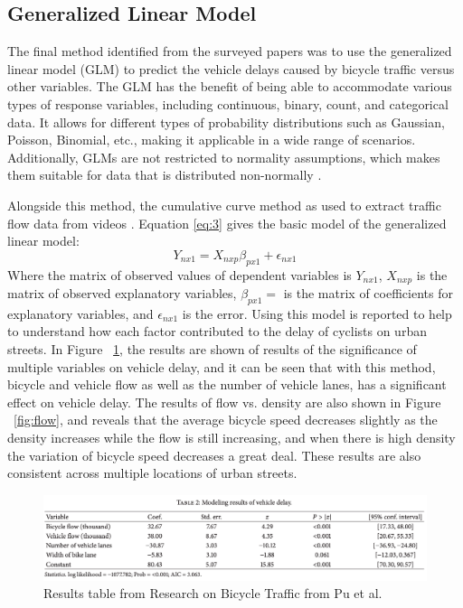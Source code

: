 \documentclass[12pt, letterpaper]{article}
\begin{document}
\subsection{Generalized Linear Model}
\label{sec:gen}

The final method identified from the surveyed papers was to use the generalized linear model (GLM) to predict the vehicle delays caused by bicycle traffic versus other variables. The GLM has the benefit of being able to accommodate various types of response variables, including continuous, binary, count, and categorical data. It allows for different types of probability distributions such as Gaussian, Poisson, Binomial, etc., making it applicable in a wide range of scenarios. Additionally, GLMs are not restricted to normality assumptions, which makes them suitable for data that is distributed non-normally \cite{PennState2023}.

Alongside this method, the cumulative curve method as used to extract traffic flow data from videos \cite{6Pu2017}. Equation \ref{eq:3} gives the basic model of the generalized linear model:
\begin{equation}\label{eq:3}
Y_{nx1} = X_{nxp}\beta_{px1}+\epsilon_{nx1}
\end{equation}
Where the matrix of observed values of dependent variables is  $Y_{nx1}$, $X_{nxp}$ is the matrix of observed explanatory variables, $\beta_{px1} =$ is the matrix of coefficients for explanatory variables, and $\epsilon_{nx1}$ is the error. Using this model is reported to help to understand how each factor contributed to the delay of cyclists on urban streets. In Figure ~\ref{fig:traffic}, the results are shown of results of the significance of multiple variables on vehicle delay, and it can be seen that with this method, bicycle and vehicle flow as well as the number of vehicle lanes, has a significant effect on vehicle delay. The results of flow vs. density are also shown in Figure ~\ref{fig:flow}, and reveals that the average bicycle speed decreases slightly as the density increases while  the flow is still increasing, and  when there is high density the variation of bicycle speed decreases a great deal. These results are also consistent across multiple locations of urban streets. 
\begin{figure}[hbt!]
    \centering \includegraphics[width=1\textwidth]{BikeTrafficResults.png}
    \caption{Results table from Research on Bicycle Traffic from Pu et al.}
    \label{fig:traffic}
\end{figure}
\end{document}
